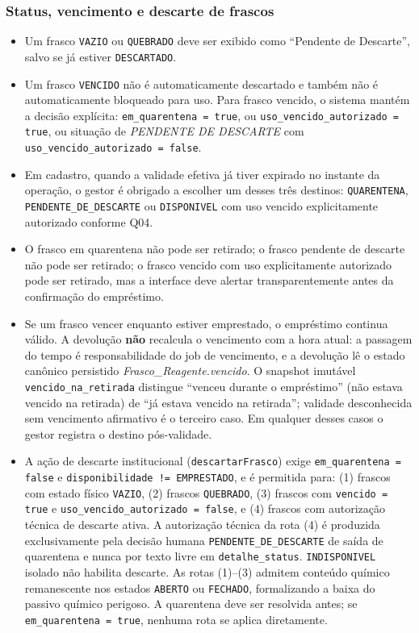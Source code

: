 \subsubsection{Status, vencimento e descarte de frascos}
\begin{regra}
\begin{itemize}
    \item Um frasco \texttt{VAZIO} ou \texttt{QUEBRADO} deve ser exibido como ``Pendente de Descarte'', salvo se já estiver \texttt{DESCARTADO}.
    \item Um frasco \texttt{VENCIDO} não é automaticamente descartado e também não é automaticamente bloqueado para uso. Para frasco vencido, o sistema mantém a decisão explícita: \texttt{em\_quarentena = true}, ou \texttt{uso\_vencido\_autorizado = true}, ou situação de \textit{PENDENTE DE DESCARTE} com \texttt{uso\_vencido\_autorizado = false}.
    \item Em cadastro, quando a validade efetiva já tiver expirado no instante da operação, o gestor é obrigado a escolher um desses três destinos: \texttt{QUARENTENA}, \texttt{PENDENTE\_DE\_DESCARTE} ou \texttt{DISPONIVEL} com uso vencido explicitamente autorizado conforme Q04.
    \item O frasco em quarentena não pode ser retirado; o frasco pendente de descarte não pode ser retirado; o frasco vencido com uso explicitamente autorizado pode ser retirado, mas a interface deve alertar transparentemente antes da confirmação do empréstimo.
    \item Se um frasco vencer enquanto estiver emprestado, o empréstimo continua válido. A devolução \textbf{não} recalcula o vencimento com a hora atual: a passagem do tempo é responsabilidade do job de vencimento, e a devolução lê o estado canônico persistido \textit{Frasco\_Reagente.vencido}. O snapshot imutável \texttt{vencido\_na\_retirada} distingue ``venceu durante o empréstimo'' (não estava vencido na retirada) de ``já estava vencido na retirada''; validade desconhecida sem vencimento afirmativo é o terceiro caso. Em qualquer desses casos o gestor registra o destino pós-validade.
    \item A ação de descarte institucional (\texttt{descartarFrasco}) exige \texttt{em\_quarentena = false} e \texttt{disponibilidade != EMPRESTADO}, e é permitida para: (1) frascos com estado físico \texttt{VAZIO}, (2) frascos \texttt{QUEBRADO}, (3) frascos com \texttt{vencido = true} e \texttt{uso\_vencido\_autorizado = false}, e (4) frascos com autorização técnica de descarte ativa. A autorização técnica da rota (4) é produzida exclusivamente pela decisão humana \texttt{PENDENTE\_DE\_DESCARTE} de saída de quarentena e nunca por texto livre em \texttt{detalhe\_status}. \texttt{INDISPONIVEL} isolado não habilita descarte. As rotas (1)--(3) admitem conteúdo químico remanescente nos estados \texttt{ABERTO} ou \texttt{FECHADO}, formalizando a baixa do passivo químico perigoso. A quarentena deve ser resolvida antes; se \texttt{em\_quarentena = true}, nenhuma rota se aplica diretamente.
\end{itemize}
\end{regra}

